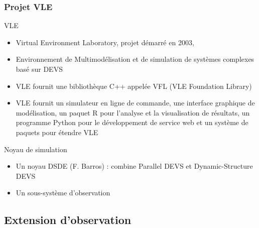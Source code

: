 \documentclass[xetex, compress, table, svgnames]{beamer}
\begin{document}
\begin{frame}
  \frametitle{Projet VLE}
  \begin{block}{VLE}
    \begin{itemize}
    \item \alert{Virtual Environment Laboratory}, projet démarré en
      2003,
    \item Environnement de Multimodélisation et de simulation de
      systèmes complexes basé sur DEVS
    \item VLE fournit une bibliothèque C++ appelée VFL
      (\alert{VLE Foundation Library})
    \item VLE fournit un \alert{simulateur en ligne de commande}, une
      \alert{interface graphique} de modélisation, un \alert{paquet R}
      pour l'analyse et la visualisation de résultats, un
      \alert{programme Python} pour le développement de service web et
      un \alert{système de paquets} pour étendre VLE
    \end{itemize}
  \end{block}
  \pause
  \begin{alertblock}{Noyau de simulation}
    \begin{itemize}
    \item Un noyau DSDE (F. Barros) : combine \alert{Parallel DEVS} et
      \alert{Dynamic-Structure DEVS}
    \item Un sous-système d'observation
    \end{itemize}
  \end{alertblock}
\end{frame}

\subsection{Extension d'observation}
\end{document}
